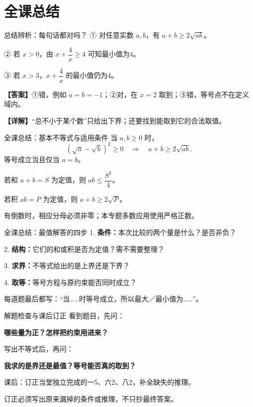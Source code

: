 \documentclass[UTF8,10pt,aspectratio=169]{ctexbeamer}
\newcommand{\Answer}[1]{\par\vspace{0.2cm}\textbf{【答案】}#1}
\newcommand{\Analysis}[1]{\par\vspace{0.2cm}\textbf{【详解】}#1}
\begin{document}
\section{全课总结}
\begin{frame}[t]{总结辨析：每句话都对吗？}
① 对任意实数 $a,b$，有 $a+b\ge2\sqrt{ab}$。\par\vspace{0.3cm}
② 若 $x>0$，由 $x+\dfrac{4}{x}\ge4$ 可知最小值为4。\par\vspace{0.3cm}
③ 若 $x>3$，$x+\dfrac{4}{x}$ 的最小值仍为4。
\pause
\Answer{①错，例如 $a=b=-1$；②对，在 $x=2$ 取到；③错，等号点不在定义域内。}
\Analysis{“总不小于某个数”只给出下界；还要找到能取到它的合法取值。}
\end{frame}
\begin{frame}[t]{全课总结：基本不等式与适用条件}
当 $a,b\ge0$ 时，
\[(\sqrt a-\sqrt b)^2\ge0\quad\Rightarrow\quad a+b\ge2\sqrt{ab}.\]
等号成立当且仅当 $a=b$。
\pause
\par\vspace{0.3cm}若和 $a+b=S$ 为定值，则 $ab\le \dfrac{S^2}{4}$。\par\vspace{0.25cm}
若积 $ab=P$ 为定值，则 $a+b\ge2\sqrt P$。\par\vspace{0.3cm}
有倒数时，相应分母必须非零；本专题多数应用使用严格正数。
\end{frame}
\begin{frame}[t]{全课总结：最值解答的四步}
1. \textbf{条件：}本次比较的两个量是什么？是否非负？\par\vspace{0.3cm}
2. \textbf{结构：}它们的和或积是否为定值？需不需要整理？\par\vspace{0.3cm}
3. \textbf{求界：}不等式给出的是上界还是下界？\par\vspace{0.3cm}
4. \textbf{取等：}等号方程与原约束能否同时成立？\par\vspace{0.4cm}
每道题最后都写：“当……时等号成立，所以最大／最小值为……”。
\end{frame}
\begin{frame}[t]{解题检查与课后订正}
看到题目，先问：\par\vspace{0.25cm}
\textbf{哪些量为正？怎样把约束用进来？}\par\vspace{0.3cm}
写出不等式后，再问：\par\vspace{0.25cm}
\textbf{我求的是界还是最值？等号能否真的取到？}\par\vspace{0.4cm}
课后：订正当堂独立完成的一5、六2、八2，补全缺失的推理。\par\vspace{0.3cm}
订正必须写出原来漏掉的条件或推理，不只抄最终答案。
\end{frame}
\end{document}
